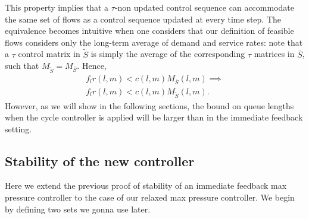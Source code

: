 This property implies that a $\tau$-non updated control sequence can accommodate the same set of flows as a control sequence updated at every time step. The equivalence becomes intuitive when one considers that our definition of feasible flows considers only the long-term average of demand and service rates: note that a $\tau$ control matrix in $\tilde S$ is simply the average of the corresponding $\tau$ matrices in $\overline S$, such that $M_{\tilde S} = M_{\overline S}$. Hence,
\begin{align}
f_{l} r(l,m) < c(l,m)M_{\overline{S} }(l,m) \implies \\ f_{l} r(l,m) < c(l,m)M_{\tilde{S} }(l,m). \nonumber
\end{align}
However, as we will show in the following sections, the bound on queue lengths when the cycle controller is applied will be larger than in the immediate feedback setting.






\subsection*{Stability of the new controller}



Here we extend the previous proof of stability of an immediate feedback max pressure controller to the case of our relaxed max pressure controller.
We begin by defining two sets we gonna use later.

